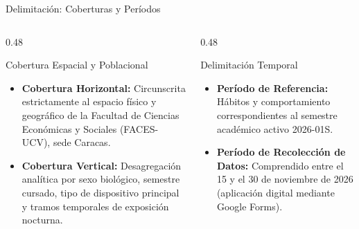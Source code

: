 \documentclass[10pt, aspectratio=169]{beamer}
\begin{document}
\begin{frame}{Delimitación: Coberturas y Períodos}
    \begin{columns}[T]
        \begin{column}{0.48\textwidth}
            \begin{block}{Cobertura Espacial y Poblacional}
                \begin{itemize}
                    \item \textbf{Cobertura Horizontal:} Circunscrita estrictamente al espacio físico y geográfico de la Facultad de Ciencias Económicas y Sociales (FACES-UCV), sede Caracas.
                    \item \textbf{Cobertura Vertical:} Desagregación analítica por sexo biológico, semestre cursado, tipo de dispositivo principal y tramos temporales de exposición nocturna.
                \end{itemize}
            \end{block}
        \end{column}
        \begin{column}{0.48\textwidth}
            \begin{block}{Delimitación Temporal}
                \begin{itemize}
                    \item \textbf{Período de Referencia:} Hábitos y comportamiento correspondientes al semestre académico activo 2026-01S.
                    \item \textbf{Período de Recolección de Datos:} Comprendido entre el 15 y el 30 de noviembre de 2026 (aplicación digital mediante Google Forms).
                \end{itemize}
            \end{block}
        \end{column}
    \end{columns}
\end{frame}
\end{document}
